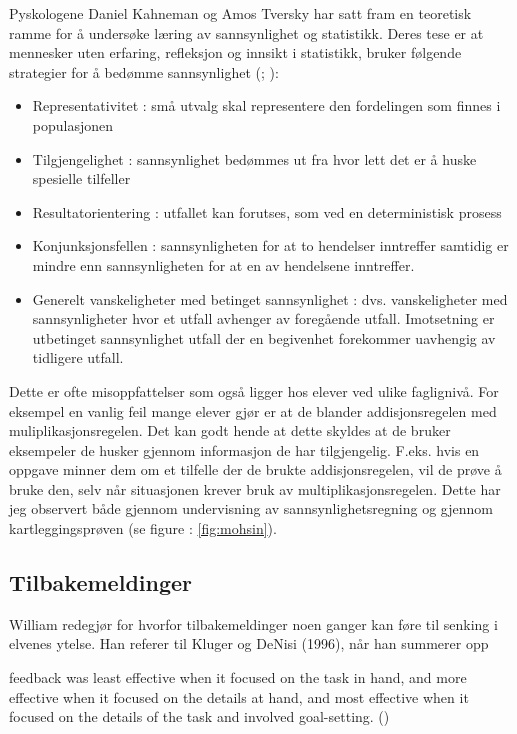\documentclass[main.tex]{subfiles}
\begin{document}
Pyskologene Daniel Kahneman og Amos Tversky har satt fram en teoretisk 
ramme for å undersøke læring av sannsynlighet og statistikk. Deres tese er at mennesker uten erfaring, refleksjon og 
innsikt i statistikk, bruker følgende strategier for å bedømme sannsynlighet (; ):
\begin{itemize}
\item Representativitet : små utvalg skal representere den fordelingen som finnes i populasjonen
\item Tilgjengelighet : sannsynlighet bedømmes ut fra hvor lett det er å huske spesielle tilfeller
\item Resultatorientering : utfallet kan forutses, som ved en deterministisk prosess
\item Konjunksjonsfellen : sannsynligheten for at to hendelser inntreffer samtidig er mindre enn sannsynligheten
for at en av hendelsene inntreffer.
\item Generelt vanskeligheter med betinget sannsynlighet : dvs. vanskeligheter med sannsynligheter hvor et utfall
avhenger av foregående utfall. Imotsetning er utbetinget sannsynlighet utfall der en begivenhet forekommer uavhengig 
av tidligere utfall. 
\end{itemize}
Dette er ofte misoppfattelser som også ligger hos elever ved ulike faglignivå. For eksempel en vanlig feil
mange elever gjør er at de blander addisjonsregelen med muliplikasjonsregelen. Det kan godt hende at dette
skyldes at de bruker eksempeler de husker gjennom informasjon de har tilgjengelig. F.eks. hvis en oppgave minner
dem om et tilfelle der de brukte addisjonsregelen, vil de prøve å bruke den, selv når situasjonen krever bruk
av multiplikasjonsregelen. Dette har jeg observert både gjennom undervisning av sannsynlighetsregning og
gjennom kartleggingsprøven (se figure : \ref{fig:mohsin}).
\newline



\subsection*{Tilbakemeldinger}

William redegjør for hvorfor tilbakemeldinger noen ganger kan føre til senking 
i elvenes ytelse. Han referer til Kluger og DeNisi (1996), når han summerer opp 
\begin{displayquote}
\textelp{} feedback was least effective when it focused on the task in hand, 
and more effective when it focused on the details at hand, and most effective 
when it focused on the details of the task and involved goal-setting.
()
\end{displayquote}
\end{document}
